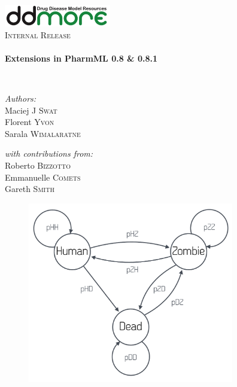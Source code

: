 \begin{titlepage}
\begin{center}

\includegraphics[width=0.35\textwidth]{./logo/ddmore_logo}~\\[1cm]

%
\textsc{\Large Internal Release}\\[0.5cm]

\HRule \\[0.4cm]
{ \huge \bfseries Extensions in PharmML 0.8 \& 0.8.1 \\[0.4cm] }

\HRule \\[1.5cm]

\begin{minipage}{0.5\textwidth}
\begin{flushleft} \large
\emph{Authors:}\\
Maciej J \textsc{Swat}\\
Florent \textsc{Yvon}\\
Sarala \textsc{Wimalaratne}\\
\end{flushleft}
\end{minipage}
\begin{minipage}{0.4\textwidth}
\begin{flushright} \large
\emph{with contributions from:} \\
Roberto \textsc{Bizzotto} \\
Emmanuelle \textsc{Comets} \\
Gareth \textsc{Smith} \\
\end{flushright}
\end{minipage}

\vfill
\begin{figure}[htb]
\centering
  \includegraphics[width=90mm]{pics/MarkovZombie_title}
\end{figure}




\end{center}
\end{titlepage}
